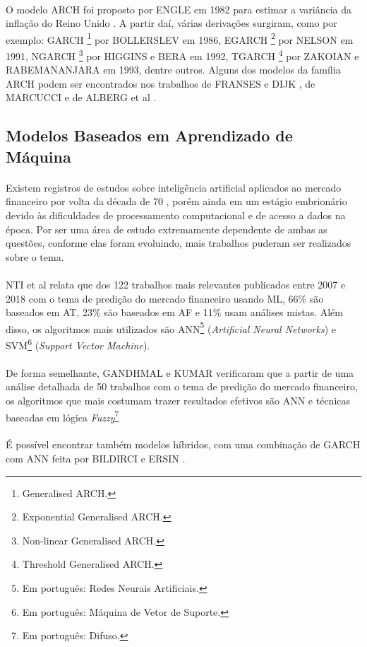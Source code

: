 \paragraph{} O modelo ARCH foi proposto por ENGLE em 1982 para estimar a variância da inflação do Reino Unido \cite{engle1982autoregressive}. A partir daí, várias derivações surgiram, como por exemplo: GARCH \footnote{Generalised ARCH.} por BOLLERSLEV \cite{bollerslev1986generalized} em 1986, EGARCH \footnote{Exponential Generalised ARCH.} por NELSON em 1991, NGARCH \footnote{Non-linear Generalised ARCH.} por HIGGINS e BERA\cite{higgins1992class} em 1992, TGARCH \footnote{Threshold Generalised ARCH.} por ZAKOIAN e RABEMANANJARA \cite{rabemananjara1993threshold} em 1993, dentre outros. Alguns dos modelos da família ARCH podem ser encontrados nos trabalhos de FRANSES e DIJK \cite{franses1996forecasting}, de MARCUCCI \cite{marcucci2005forecasting} e de ALBERG et al \cite{alberg2008estimating}.


\subsection{Modelos Baseados em Aprendizado de Máquina}

\paragraph{} Existem registros de estudos sobre inteligência artificial aplicados ao mercado financeiro por volta da década de 70 \cite{felsen1975artificial}, porém ainda em um estágio embrionário devido às dificuldades de processamento computacional e de acesso a dados na época. Por ser uma área de estudo extremamente dependente de ambas as questões, conforme elas foram evoluindo, mais trabalhos puderam ser realizados sobre o tema.

\paragraph{} NTI et al \cite{nti2020systematic} relata que dos 122 trabalhos mais relevantes publicados entre 2007 e 2018 com o tema de predição do mercado financeiro usando ML, 66\% são baseados em AT, 23\% são baseados em AF e 11\% usam análises mistas. Além disso, os algoritmos mais utilizados são ANN\footnote{Em português: Redes Neurais Artificiais.} (\textit{Artificial Neural Networks}) e SVM\footnote{Em português: Máquina de Vetor de Suporte.} (\textit{Support Vector Machine}).

\paragraph{} De forma semelhante, GANDHMAL e KUMAR \cite{gandhmal2019systematic} verificaram que a partir de uma análise detalhada de 50 trabalhos com o tema de predição do mercado financeiro, os algoritmos que mais costumam trazer resultados efetivos são ANN e técnicas baseadas em lógica \textit{Fuzzy}\footnote{Em português: Difuso.}

\paragraph{} É possível encontrar também modelos híbridos, com uma combinação de GARCH com ANN feita por BILDIRCI e ERSIN \cite{bildirici2009improving}.